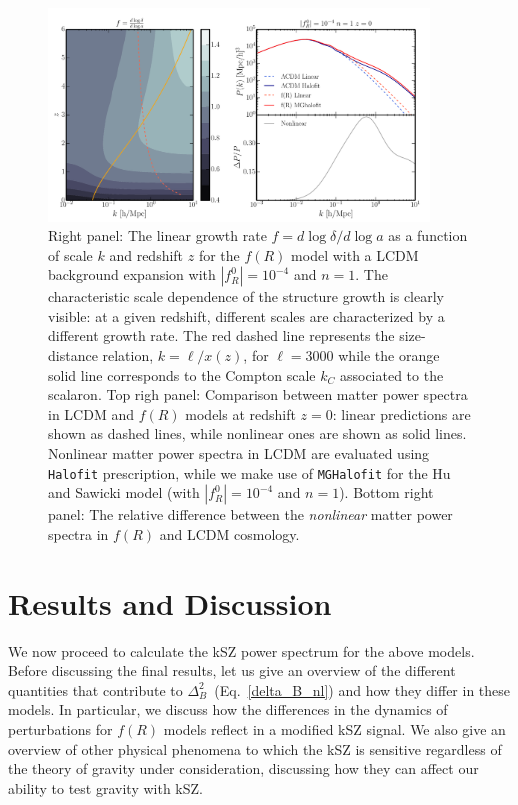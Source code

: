 \begin{figure}[th]
\begin{center}
\includegraphics[width=0.9\textwidth]{Chapter6/Images/growth_pk}
\caption{Right panel: The linear growth rate $f = d\log{\delta}/d\log{a}$ as a function of scale $k$ and redshift $z$ for the $f(R)$ model with a \gls{LCDM} background expansion with $|f^0_R|=10^{-4}$ and $n=1$. The characteristic scale dependence of the structure growth is clearly visible: at a given redshift, different scales are characterized by a different growth rate. The red dashed line represents the size-distance relation, $k = \ell/x(z)$, for $\ell = 3000$ while the orange solid line corresponds to the Compton scale $k_C$ associated to the scalaron. Top righ panel: Comparison between matter power spectra in \gls{LCDM} and $f(R)$ models at redshift $z=0$: linear predictions are shown as dashed lines, while nonlinear ones are shown as solid lines. Nonlinear matter power spectra in \gls{LCDM} are evaluated using \texttt{Halofit} prescription, while we make use of \texttt{MGHalofit} for the Hu and Sawicki model (with $|f^0_R|=10^{-4}$ and $n=1$). Bottom right panel:  The relative difference between the \emph{nonlinear} matter power spectra in $f(R)$ and \gls{LCDM} cosmology.}
\label{Fig:growth_pk}
\end{center}
\end{figure}


\section{Results and Discussion}\label{Sec:Results}
We now proceed to calculate the kSZ  power spectrum for the above models. Before discussing the final results, let us give an overview of the different quantities that contribute to $\Delta^2_B$~(Eq.~\eqref{delta_B_nl}) and how they differ in these models.  In particular, we  discuss how the differences in the dynamics of perturbations for $f(R)$ models reflect in a modified kSZ signal. We also give an overview of other physical phenomena to which the kSZ is sensitive regardless of the theory of gravity under consideration, discussing how they can affect our ability to test gravity with kSZ.
 

